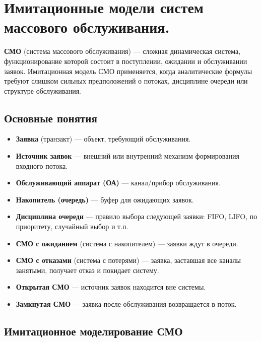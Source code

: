 \section{Имитационные модели систем массового обслуживания.}

\textbf{СМО} (система массового обслуживания) — сложная динамическая система, функционирование которой состоит в поступлении, ожидании и обслуживании заявок. Имитационная модель СМО применяется, когда аналитические формулы требуют слишком сильных предположений о потоках, дисциплине очереди или структуре обслуживания.

\subsection*{Основные понятия}

\begin{itemize}
  \item \textbf{Заявка} (транзакт) — объект, требующий обслуживания.
  \item \textbf{Источник заявок} — внешний или внутренний механизм формирования входного потока.
  \item \textbf{Обслуживающий аппарат (ОА)} — канал/прибор обслуживания.
  \item \textbf{Накопитель (очередь)} — буфер для ожидающих заявок.
  \item \textbf{Дисциплина очереди} — правило выбора следующей заявки: FIFO, LIFO, по приоритету, случайный выбор и т.п.
  \item \textbf{СМО с ожиданием} (система с накопителем) — заявки ждут в очереди.
  \item \textbf{СМО с отказами} (система с потерями) — заявка, заставшая все каналы занятыми, получает отказ и покидает систему.
  \item \textbf{Открытая СМО} — источник заявок находится вне системы.
  \item \textbf{Замкнутая СМО} — заявка после обслуживания возвращается в поток.
\end{itemize}

\subsection*{Имитационное моделирование СМО}

